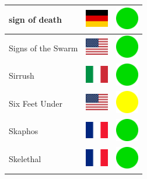 \documentclass[12pt, a4paper, twoside]{report}
\begin{document}
\begin{center}
\begin{longtable}{|p{5cm}|p{2cm}|p{2cm}|}
sign of death & \includegraphics[width=1cm]{4x3/de} & \includegraphics[width=1cm]{likes/y} \\ \hline
Signs of the Swarm & \includegraphics[width=1cm]{4x3/us} & \includegraphics[width=1cm]{likes/y} \\ \hline
Sirrush & \includegraphics[width=1cm]{4x3/it} & \includegraphics[width=1cm]{likes/y} \\ \hline
Six Feet Under & \includegraphics[width=1cm]{4x3/us} & \includegraphics[width=1cm]{likes/m} \\ \hline
Skaphos & \includegraphics[width=1cm]{4x3/fr} & \includegraphics[width=1cm]{likes/y} \\ \hline
Skelethal & \includegraphics[width=1cm]{4x3/fr} & \includegraphics[width=1cm]{likes/y} \\ \hline

\end{longtable}
\end{center}
\end{document}
